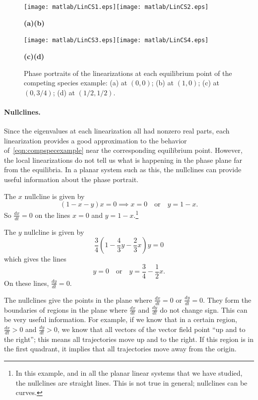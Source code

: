 \documentclass{book}
\begin{document}
\begin{figure}
\centerline{\texttt{[image: matlab/LinCS1.eps]}\texttt{[image: matlab/LinCS2.eps]}}
\vspace{-0.2in}
\centerline{\hspace{0.2in}\textbf{(a)}\hspace{2.1in}\textbf{(b)}}
\centerline{\texttt{[image: matlab/LinCS3.eps]}\texttt{[image: matlab/LinCS4.eps]}}
\vspace{-0.2in}
\centerline{\hspace{0.2in}\textbf{(c)}\hspace{2.1in}\textbf{(d)}}
\caption{Phase portraits of the linearizations at each equilibrium point
of the competing species example:
(a) at $(0,0)$; (b) at $(1,0)$; (c) at $(0,3/4)$; (d) at $(1/2,1/2)$.}
\label{fig:CompSpecLinPlots}
\end{figure}



\paragraph{Nullclines.}
Since the eigenvalues at each linearization
all had nonzero real parts, each linearization
provides a good approximation to the behavior
of~\eqref{eqn:compspecexample} near the corresponding
equilibrium point.
However, the local linearizations do not tell us what is
happening in the phase plane far from the equilibria.
In a planar system such as this, the nullclines
can provide useful information about the phase portrait.

The $x$ nullcline is given by
\begin{equation}
   (1-x-y)x = 0 \implies x=0 \quad\textrm{or}\quad y = 1-x.
\end{equation}
So $\frac{dx}{dt}=0$ on the lines $x=0$
and $y=1-x$.\footnote{In this example, and in all
the planar linear systems that we have studied,
the nullclines are straight lines. This is not true in general;
nullclines can be curves.}

The $y$ nullcline is given by
\begin{equation}
  \frac{3}{4}\left(1-\frac{4}{3}y - \frac{2}{3} x\right)y = 0
\end{equation}
which gives the lines
\begin{equation}
  y = 0 \quad \textrm{or} \quad y = \frac{3}{4} - \frac{1}{2}x.
\end{equation}
On these lines, $\frac{dy}{dt}=0$.

The nullclines give the points in the plane where 
$\frac{dx}{dt}=0$ or $\frac{dy}{dt}=0$.
They form the boundaries of regions in the plane
where $\frac{dx}{dt}$ and $\frac{dy}{dt}$ do not change sign.
This can be very useful information.
For example, if we know that in a certain region,
$\frac{dx}{dt} > 0$ and $\frac{dy}{dt}>0$, we know that all
vectors of the vector field point ``up and to the right'';
this means all trajectories move up and to the right.
If this region is in the first quadrant, it implies that
all trajectories move away from the origin.
\end{document}
